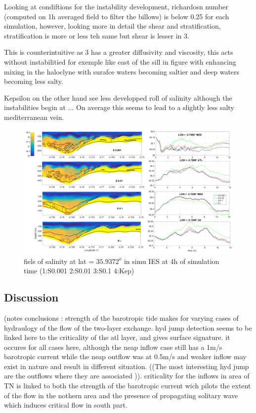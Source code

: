 Looking at condiftions for the instability development, richardosn number (computed on 1h averaged field to filter the billows) is below 0.25 for each simulation, however, looking more in detail the shear and stratification, stratification is more or less teh same but shear is lesser in 3.

This is counterintuitive as 3 has a greater diffusivity and viscosity, this acts without instabilitied for exemple like east of the sill in figure with enhancing mixing in the haloclyne with surafce waters becoming saltier and deep waters becoming less salty.

Kepsilon on the other hand see less developped roll of salinity although the instabilities begin at ... On average this seems to lead to a slightly less salty mediterranean vein.


\begin{figure}[!h]
 \includegraphics[width=\textwidth]{./GBR3D/Figsmago.png}
 \caption {fiels of salinity at lat = $35.9372^o$ in simu IES at 4h of simulation time  (1:S0.001  2:S0.01  3:S0.1 4:Kep)}
\end{figure}

\subsection{Discussion}


(notes conclusions : strength of the barotropic tide makes for varying cases of hydraulogy of the flow of the two-layer exchange. hyd jump detection seems to be linked here to the criticality of the atl layer, and gives surface signature. it occures for all cases here, although the neap inflow case still has a 1m/s barotropic current while the neap outflow was at 0.5m/s and weaker inflow may exist in nature and result in different situation. ((The most interesting hyd jump are the outflows where they are associated  )). criticality for the inflows in area of TN is linked to both the strength of the barotropic current wich pilots the extent of the flow in the nothern area and the presence of propagating solitary wave which induces critical flow in south part.

